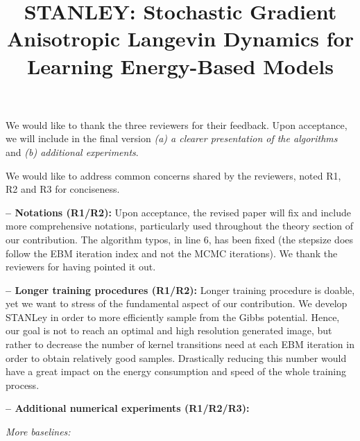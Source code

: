 \documentclass[10pt,twocolumn,letterpaper]{article}
\begin{document}
\title{STANLEY: Stochastic Gradient Anisotropic Langevin Dynamics for Learning Energy-Based Models}  %

\maketitle
\thispagestyle{empty}



We would like to thank the three reviewers for their feedback. 
Upon acceptance, we will include in the final version \emph{{\sf (a)} a clearer presentation of the algorithms} and \emph{{\sf (b)} additional experiments}. 


We would like to address common concerns shared by the reviewers, noted R1, R2 and R3 for conciseness.

\noindent  \textbf{-- Notations (R1/R2):}
Upon acceptance, the revised paper will fix and include more comprehensive notations, particularly used throughout the theory section of our contribution.
The algorithm typos, in line 6, has been fixed (the stepsize does follow the EBM iteration index and not the MCMC iterations). We thank the reviewers for having pointed it out.

\noindent \textbf{-- Longer training procedures (R1/R2):}
Longer training procedure is doable, yet we want to stress of the fundamental aspect of our contribution. We develop STANLey in order to more efficiently sample from the Gibbs potential. Hence, our goal is not to reach an optimal and high resolution generated image, but rather to decrease the number of kernel transitions need at each EBM iteration in order to obtain relatively good samples.
Drastically reducing this number would have a great impact on the energy consumption and speed of the whole training process.


\noindent \textbf{-- Additional numerical experiments (R1/R2/R3):}

\textit{More baselines:}
\end{document}
